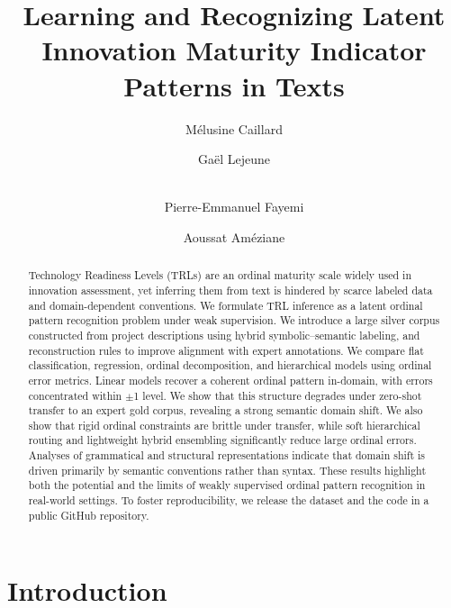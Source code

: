 \documentclass[runningheads]{llncs}
\title{Learning and Recognizing Latent Innovation Maturity Indicator Patterns in Texts}
\author{Mélusine Caillard\inst{1,2,3} \and
Gaël Lejeune\inst{1}\orcidID{0000-0002-4795-2362} \and \\ 
Pierre-Emmanuel Fayemi\inst{3} \and
Aoussat Améziane\inst{2}}
\institute{STIH, Sorbonne Université, Paris \and
LCPI, ENSAM, Paris \and IKOS Lab, Levallois-Perret}
\begin{document}
\maketitle 

%
\begin{abstract}
Technology Readiness Levels (TRLs) are an ordinal  maturity scale widely used in innovation assessment, yet inferring them from text is hindered by scarce labeled data and domain-dependent conventions. We formulate TRL inference as a latent ordinal pattern recognition problem under weak supervision. We introduce a large silver corpus  constructed from project descriptions using hybrid symbolic–semantic labeling, and reconstruction rules to improve alignment with expert annotations. 
We compare flat classification, regression, ordinal decomposition, and hierarchical models using ordinal error metrics. Linear models recover a coherent ordinal pattern in-domain, with errors concentrated within $\pm$1 level. We show that this structure degrades under zero-shot transfer to an expert gold corpus, revealing a strong semantic domain shift. We also show that rigid ordinal constraints are brittle under transfer, while soft hierarchical routing and lightweight hybrid ensembling significantly reduce large ordinal errors. Analyses of grammatical and structural representations indicate that domain shift is driven primarily by semantic conventions rather than syntax. These results highlight both the potential and the limits of weakly supervised ordinal pattern recognition in real-world settings. To foster reproducibility, we release the dataset and the code in a public GitHub repository.


\end{abstract}
%
%
%
\section{Introduction}
\end{document}
